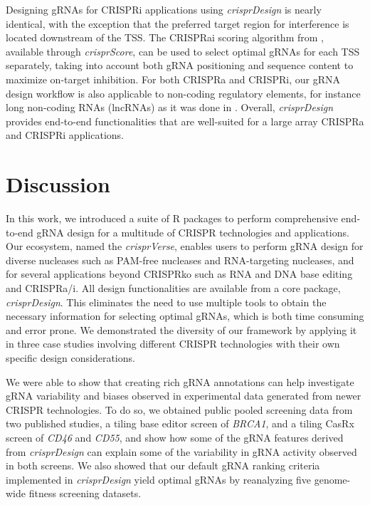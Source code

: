 \documentclass[pdftex,english,10pt]{article}
\begin{document}
Designing gRNAs for CRISPRi applications using \textit{crisprDesign} is nearly identical, with the exception that the preferred target region for interference is located downstream of the TSS. The CRISPRai scoring algorithm from \citet{crispria}, available through \textit{crisprScore}, can be used to select optimal gRNAs for each TSS separately, taking into account both gRNA positioning and sequence content to maximize on-target inhibition. For both CRISPRa and CRISPRi, our gRNA design workflow is also applicable to non-coding regulatory elements, for instance long non-coding RNAs (lncRNAs) as it was done in \citet{liu2017crispri}. Overall, \textit{crisprDesign} provides end-to-end functionalities that are well-suited for a large array CRISPRa and CRISPRi applications.




\section*{Discussion}


In this work, we introduced a suite of R packages to perform comprehensive end-to-end gRNA design for a multitude of CRISPR technologies and applications. Our ecosystem, named the \textit{crisprVerse},  enables users to perform gRNA design for diverse nucleases such as PAM-free nucleases and RNA-targeting nucleases, and for several applications beyond CRISPRko such as RNA and DNA base editing and CRISPRa/i. All design functionalities are available from a core package, \textit{crisprDesign}. This eliminates the need to use multiple tools to obtain the necessary information for selecting optimal gRNAs, which is both time consuming and error prone. We demonstrated the diversity of our framework by applying it in three case studies involving different CRISPR technologies with their own specific design considerations. 

We were able to show that creating rich gRNA annotations can help investigate gRNA variability and biases observed in experimental data generated from newer CRISPR technologies. To do so, we obtained public pooled screening data from two published studies, a tiling base editor screen of \textit{BRCA1}, and a tiling CasRx screen of \textit{CD46} and \textit{CD55}, and show how some of the gRNA features derived from \textit{crisprDesign} can explain some of the variability in gRNA activity observed in both screens. We also showed that our default gRNA ranking criteria implemented in \textit{crisprDesign} yield optimal gRNAs by reanalyzing five genome-wide fitness screening datasets. 
\end{document}
